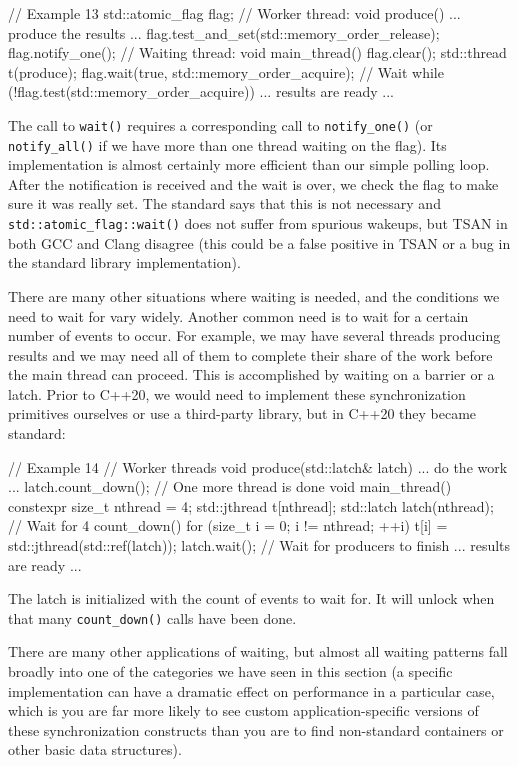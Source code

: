 \begin{code}
// Example 13
std::atomic_flag flag;
// Worker thread:
void produce() {
  ... produce the results ...
  flag.test_and_set(std::memory_order_release);
  flag.notify_one();
}
// Waiting thread:
void main_thread() {
  flag.clear();
  std::thread t(produce);
  flag.wait(true, std::memory_order_acquire); // Wait
  while (!flag.test(std::memory_order_acquire)) {}
  ... results are ready ...
}
\end{code}

The call to \texttt{wait()} requires a corresponding call to \texttt{notify\_one()} (or \texttt{notify\_all()} if we have more than one thread waiting on the flag). Its implementation is almost certainly more efficient than our simple polling loop. After the notification is received and the wait is over, we check the flag to make sure it was really set. The standard says that this is not necessary and \texttt{std::atomic\_flag::wait()} does not suffer from spurious wakeups, but TSAN in both GCC and Clang disagree (this could be a false positive in TSAN or a bug in the standard library implementation).

There are many other situations where waiting is needed, and the conditions we need to wait for vary widely. Another common need is to wait for a certain number of events to occur. For example, we may have several threads producing results and we may need all of them to complete their share of the work before the main thread can proceed. This is accomplished by waiting on a barrier or a latch. Prior to C++20, we would need to implement these synchronization primitives ourselves or use a third-party library, but in C++20 they became standard:

\begin{code}
// Example 14
// Worker threads
void produce(std::latch& latch) {
  ... do the work ...
  latch.count_down();     // One more thread is done
}
void main_thread() {
  constexpr size_t nthread = 4;
  std::jthread t[nthread];
  std::latch latch(nthread); // Wait for 4 count_down()
  for (size_t i = 0; i != nthread; ++i) {
    t[i] = std::jthread(std::ref(latch));
  }
  latch.wait();   // Wait for producers to finish
  ... results are ready ...
}
\end{code}

The latch is initialized with the count of events to wait for. It will unlock when that many \texttt{count\_down()} calls have been done.

There are many other applications of waiting, but almost all waiting patterns fall broadly into one of the categories we have seen in this section (a specific implementation can have a dramatic effect on performance in a particular case, which is you are far more likely to see custom application-specific versions of these synchronization constructs than you are to find non-standard containers or other basic data structures).

